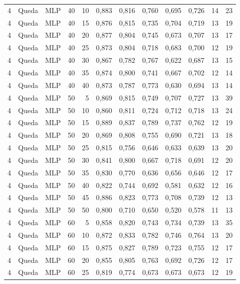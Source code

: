 \begin{longtable}{ccclrrrrrrrr}
4 & Queda & MLP & 40 & 10 & 0,883 & 0,816 & 0,760 & 0,695 & 0,726 & 14 & 23 \\
4 & Queda & MLP & 40 & 15 & 0,876 & 0,815 & 0,735 & 0,704 & 0,719 & 13 & 19 \\
4 & Queda & MLP & 40 & 20 & 0,877 & 0,804 & 0,745 & 0,673 & 0,707 & 13 & 17 \\
4 & Queda & MLP & 40 & 25 & 0,873 & 0,804 & 0,718 & 0,683 & 0,700 & 12 & 19 \\
4 & Queda & MLP & 40 & 30 & 0,867 & 0,782 & 0,767 & 0,622 & 0,687 & 13 & 15 \\
4 & Queda & MLP & 40 & 35 & 0,874 & 0,800 & 0,741 & 0,667 & 0,702 & 12 & 14 \\
4 & Queda & MLP & 40 & 40 & 0,873 & 0,787 & 0,773 & 0,630 & 0,694 & 13 & 14 \\
4 & Queda & MLP & 50 & 5 & 0,869 & 0,815 & 0,749 & 0,707 & 0,727 & 13 & 39 \\
4 & Queda & MLP & 50 & 10 & 0,860 & 0,811 & 0,724 & 0,712 & 0,718 & 13 & 24 \\
4 & Queda & MLP & 50 & 15 & 0,889 & 0,837 & 0,789 & 0,737 & 0,762 & 12 & 19 \\
4 & Queda & MLP & 50 & 20 & 0,869 & 0,808 & 0,755 & 0,690 & 0,721 & 13 & 18 \\
4 & Queda & MLP & 50 & 25 & 0,815 & 0,756 & 0,646 & 0,633 & 0,639 & 13 & 20 \\
4 & Queda & MLP & 50 & 30 & 0,841 & 0,800 & 0,667 & 0,718 & 0,691 & 12 & 20 \\
4 & Queda & MLP & 50 & 35 & 0,830 & 0,770 & 0,636 & 0,656 & 0,646 & 12 & 17 \\
4 & Queda & MLP & 50 & 40 & 0,822 & 0,744 & 0,692 & 0,581 & 0,632 & 12 & 16 \\
4 & Queda & MLP & 50 & 45 & 0,886 & 0,823 & 0,773 & 0,708 & 0,739 & 12 & 13 \\
4 & Queda & MLP & 50 & 50 & 0,800 & 0,710 & 0,650 & 0,520 & 0,578 & 11 & 13 \\
4 & Queda & MLP & 60 & 5 & 0,858 & 0,820 & 0,743 & 0,734 & 0,739 & 13 & 35 \\
4 & Queda & MLP & 60 & 10 & 0,872 & 0,833 & 0,782 & 0,746 & 0,764 & 13 & 20 \\
4 & Queda & MLP & 60 & 15 & 0,875 & 0,827 & 0,789 & 0,723 & 0,755 & 12 & 17 \\
4 & Queda & MLP & 60 & 20 & 0,855 & 0,805 & 0,763 & 0,692 & 0,726 & 12 & 17 \\
4 & Queda & MLP & 60 & 25 & 0,819 & 0,774 & 0,673 & 0,673 & 0,673 & 12 & 19 \\

\end{longtable}
